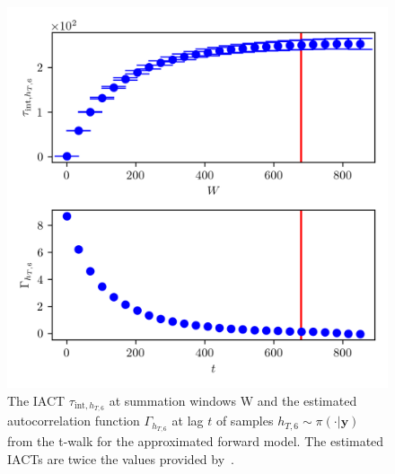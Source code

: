 \begin{figure}[ht!]
	\centering
	\includegraphics{UwerrTauIntTWalk16.png}
	\caption[IACT and autocorrelation function of samples $h_{T,6} \sim \pi(\cdot|\bm{y})$, for approximated model.]{The IACT $\tau_{\text{int},h_{T,6}}$ at summation windows W and the estimated autocorrelation function $\Gamma_{h_{T,6}}$ at lag $t$ of samples $h_{T,6} \sim \pi( \cdot| \bm{y})$ from the t-walk for the approximated forward model.
	The estimated IACTs are twice the values provided by~\cite{drikHesse, UwerrM}.}
	\label{fig:TWalkIATC17}
\end{figure}

